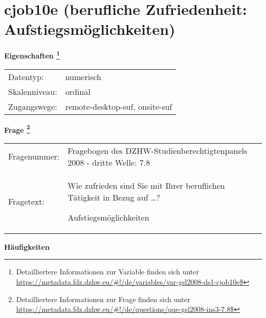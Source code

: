 
    \setcounter{footnote}{0}

    \vspace*{-1.8cm}
	\section{cjob10e (berufliche Zufriedenheit: Aufstiegsmöglichkeiten)}
	\label{section:cjob10e}



    \vspace*{0.5cm}
    \noindent\textbf{Eigenschaften
	\footnote{Detailliertere Informationen zur Variable finden sich unter
		\url{https://metadata.fdz.dzhw.eu/\#!/de/variables/var-gsl2008-ds1-cjob10e$}}}\\
	\begin{tabularx}{\hsize}{@{}lX}
	Datentyp: & numerisch \\
	Skalenniveau: & ordinal \\
	Zugangswege: &
	  remote-desktop-suf, 
	  onsite-suf
 \\
    \end{tabularx}



				\vspace*{0.5cm}
                \noindent\textbf{Frage
	                \footnote{Detailliertere Informationen zur Frage finden sich unter
		              \url{https://metadata.fdz.dzhw.eu/\#!/de/questions/que-gsl2008-ins3-7.8$}}}\\
				\begin{tabularx}{\hsize}{@{}lX}
					Fragenummer: &
					  Fragebogen des DZHW-Studienberechtigtenpanels 2008 - dritte Welle:
					  7.8
 \\
					Fragetext: & Wie zufrieden sind Sie mit Ihrer beruflichen Tätigkeit in Bezug auf …?\par  Aufstiegsmöglichkeiten \\
				\end{tabularx}





        		\vspace*{0.5cm}
                \noindent\textbf{Häufigkeiten}


